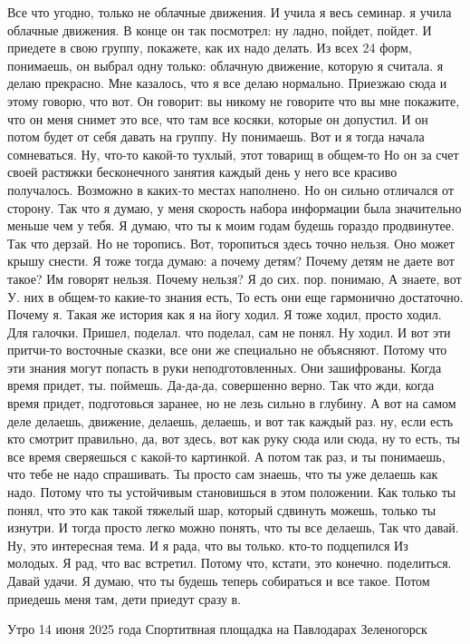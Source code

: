 Все что угодно, только не облачные движения.
И учила я весь семинар. я учила облачные движения.
В конце он так посмотрел: ну ладно, пойдет, пойдет.
И приедете в свою группу, покажете, как их надо делать.
Из всех 24 форм, понимаешь, он выбрал одну только: облачную движение, которую я считала. я делаю прекрасно.
Мне казалось, что я все делаю нормально.
Приезжаю сюда и этому говорю, что вот.
Он говорит: вы никому не говорите что вы мне покажите, что он меня снимет это все, что там все косяки, которые он допустил.
И он потом будет от себя давать на группу.
Ну понимаешь.
Вот и я тогда начала сомневаться.
Ну, что-то какой-то тухлый, этот товарищ в общем-то
Но он за счет своей растяжки бесконечного занятия каждый день у него все красиво получалось.
Возможно в каких-то местах наполнено.
Но он сильно отличался от сторону.
Так что я думаю, у меня скорость набора информации была значительно меньше чем у тебя.
Я думаю, что ты к моим годам будешь гораздо продвинутее.
Так что дерзай.
Но не торопись.
Вот, торопиться здесь точно нельзя.
Оно может крышу снести.
Я тоже тогда думаю: а почему детям?
Почему детям не даете вот такое?
Им говорят нельзя.
Почему нельзя?
Я до сих. пор.
понимаю, А знаете, вот У.
них в общем-то какие-то знания есть, То есть они еще гармонично достаточно.
Почему я.
Такая же история как я на йогу ходил.
Я тоже ходил, просто ходил.
Для галочки.
Пришел, поделал. что поделал, сам не понял.
Ну ходил.
И вот эти притчи-то восточные сказки, все они же специально не объясняют.
Потому что эти знания могут попасть в руки неподготовленных.
Они зашифрованы.
Когда время придет, ты.
поймешь.
Да-да-да, совершенно верно.
Так что жди, когда время придет, подготовься заранее, но не лезь сильно в глубину.
А вот на самом деле делаешь, движение, делаешь, делаешь, и вот так каждый раз. ну, если есть кто смотрит правильно, да, вот здесь, вот как руку сюда или сюда, ну то есть, ты все время сверяешься с какой-то картинкой.
А потом так раз, и ты понимаешь, что тебе не надо спрашивать.
Ты просто сам знаешь, что ты уже делаешь как надо.
Потому что ты устойчивым становишься в этом положении.
Как только ты понял, что это как такой тяжелый шар, который сдвинуть можешь, только ты изнутри.
И тогда просто легко можно понять, что ты все делаешь, Так что давай.
Ну, это интересная тема.
И я рада, что вы только.
кто-то подцепился Из молодых. Я рад, что вас встретил.
Потому что, кстати, это конечно.
поделиться. Давай удачи. Я думаю, что ты будешь теперь собираться и все такое. Потом приедешь меня там, дети приедут сразу в.

Утро 14 июня 2025 года
Спортитвная площадка на Павлодарах
Зеленогорск
\bye
